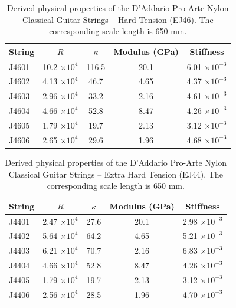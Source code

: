 \begin{table}%
  \centering
  \caption{\label{tbl:ej46_props} Derived physical properties of the D'Addario Pro-Arte Nylon Classical Guitar Strings -- Hard Tension (EJ46). The corresponding scale length is 650 mm.}
    \begin{tabular}{lcccc}
    \hline \hline
    String  & $R$ & $\kappa$ & Modulus (GPa) & Stiffness \\
    \hline
    J4601 & 10.2 $\times 10^{4}$ & 116.5 & 20.1 & 6.01 $\times 10^{-3}$ \\
    J4602 & 4.13 $\times 10^{4}$ & 46.7 & 4.65 & 4.37 $\times 10^{-3}$ \\
    J4603 & 2.96 $\times 10^{4}$ & 33.2 & 2.16 & 4.61 $\times 10^{-3}$ \\
    J4604 & 4.66 $\times 10^{4}$ & 52.8 & 8.47 & 4.26 $\times 10^{-3}$ \\
    J4605 & 1.79 $\times 10^{4}$ & 19.7 & 2.13 & 3.12 $\times 10^{-3}$ \\
    J4606 & 2.65 $\times 10^{4}$ & 29.6 & 1.96 & 4.68 $\times 10^{-3}$ \\
    \hline
    \end{tabular}%
  \label{tab:addlabel}%
\end{table}%

\begin{table}%
  \centering
  \caption{\label{tbl:ej44_props} Derived physical properties of the D'Addario Pro-Arte Nylon Classical Guitar Strings -- Extra Hard Tension (EJ44). The corresponding scale length is 650 mm.}
    \begin{tabular}{lcccc}
    \hline \hline
    String  & $R$ & $\kappa$ & Modulus (GPa) & Stiffness \\
    \hline
    J4401 & 2.47 $\times 10^{4}$ & 27.6 & 20.1 & 2.98 $\times 10^{-3}$ \\
    J4402 & 5.64 $\times 10^{4}$ & 64.2 & 4.65 & 5.21 $\times 10^{-3}$ \\
    J4403 & 6.21 $\times 10^{4}$ & 70.7 & 2.16 & 6.83 $\times 10^{-3}$ \\
    J4404 & 4.66 $\times 10^{4}$ & 52.8 & 8.47 & 4.26 $\times 10^{-3}$ \\
    J4405 & 1.79 $\times 10^{4}$ & 19.7 & 2.13 & 3.12 $\times 10^{-3}$ \\
    J4406 & 2.56 $\times 10^{4}$ & 28.5 & 1.96 & 4.70 $\times 10^{-3}$ \\
    \hline
    \end{tabular}%
  \label{tab:addlabel}%
\end{table}%

